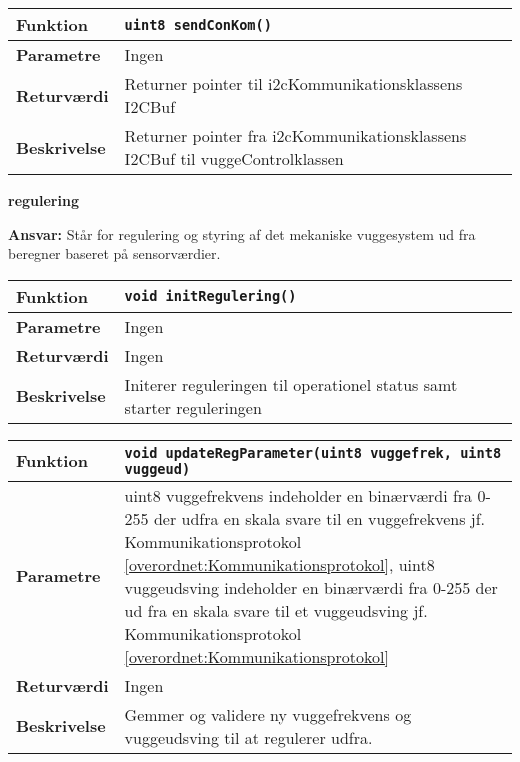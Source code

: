\begin{center}
    \begin{tabular}{ | l | p{} |}
    \hline
    \textbf{Funktion}	& \verb+uint8 sendConKom() +								\\ \hline
    \textbf{Parametre} 	& Ingen														\\ \hline
    \textbf{Returværdi}	& Returner pointer til i2cKommunikationsklassens I2CBuf											\\ \hline
    \textbf{Beskrivelse}	& Returner pointer fra i2cKommunikationsklassens I2CBuf til vuggeControlklassen	\\ \hline
    \end{tabular}
\end{center}

{\centering
\textbf{regulering}\par
}
\textbf{Ansvar:} Står for regulering og styring af det mekaniske vuggesystem ud fra beregner baseret på sensorværdier. \

\begin{center}
    \begin{tabular}{ | l | p{} |}
    \hline
    \textbf{Funktion}	& \verb+void initRegulering() +								\\ \hline
    \textbf{Parametre} 	& Ingen														\\ \hline
    \textbf{Returværdi}	& Ingen														\\ \hline
    \textbf{Beskrivelse}	& Initerer reguleringen til operationel status samt starter reguleringen	\\ \hline
    \end{tabular}
\end{center}

\begin{center}
    \begin{tabular}{ | l | p{} |}
    \hline
    \textbf{Funktion}	& \verb+void updateRegParameter(uint8 vuggefrek, uint8 vuggeud) +								\\ \hline
    \textbf{Parametre} 	& uint8 vuggefrekvens indeholder en binærværdi fra 0-255 der udfra en skala svare til en vuggefrekvens jf. Kommunikationsprotokol \ref{overordnet:Kommunikationsprotokol}, uint8 vuggeudsving indeholder en binærværdi fra 0-255 der ud fra en skala svare til et vuggeudsving jf. Kommunikationsprotokol \ref{overordnet:Kommunikationsprotokol}						\\ \hline
    \textbf{Returværdi}	& Ingen														\\ \hline
    \textbf{Beskrivelse}	& Gemmer og validere ny vuggefrekvens og vuggeudsving til at regulerer udfra. 	\\ \hline
    \end{tabular}
\end{center}



